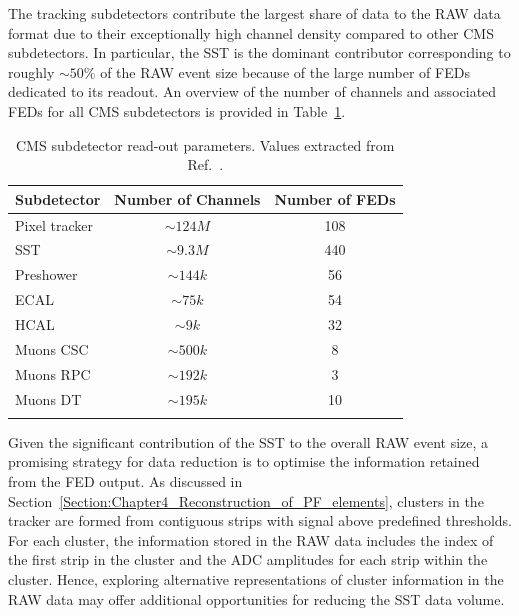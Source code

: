 The tracking subdetectors contribute the largest share of data to the RAW data format due to their exceptionally high channel density compared to other \ac{CMS} subdetectors. In particular, the \ac{SST} is the dominant contributor corresponding to roughly $\sim 50\%$ of the RAW event size because of the large number of \acp{FED} dedicated to its readout. An overview of the number of channels and associated \acp{FED} for all \ac{CMS} subdetectors is provided in Table~\ref{Table:Chapter4_RAW_Channels_FED}.

\begin{table}[htbp]
\centering
\renewcommand{\arraystretch}{1.5} %
\begin{tabular}{|l|c|c|}
\hline
Subdetector & Number of Channels & Number of \acp{FED} \\
\hline \hline
Pixel tracker & $\sim124\unit{M}$ & 108 \\
\arrayrulecolor{lightgray} \hline
\ac{SST} & $\sim9.3\unit{M}$ & 440 \\
\arrayrulecolor{lightgray} \hline
Preshower & $\sim144\unit{k}$ & 56 \\
\arrayrulecolor{lightgray} \hline
\ac{ECAL} & $\sim75\unit{k}$ & 54 \\
\arrayrulecolor{lightgray} \hline
\ac{HCAL} & $\sim9\unit{k}$ & 32 \\
\arrayrulecolor{lightgray} \hline
Muons \ac{CSC} & $\sim500\unit{k}$ & 8 \\
\arrayrulecolor{lightgray} \hline
Muons \ac{RPC} & $\sim192\unit{k}$ & 3 \\
\arrayrulecolor{lightgray} \hline
Muons \ac{DT} & $\sim195\unit{k}$ & 10 \\
\arrayrulecolor{lightgray} \hline
\arrayrulecolor{black} \hline
\end{tabular}
\caption[CMS subdetector read-out parameters]{\ac{CMS} subdetector read-out parameters. Values extracted from Ref.~\cite{LHC_CMS,CMS_Tracker_Phase1_Upgrade_2}.}
\label{Table:Chapter4_RAW_Channels_FED}
\end{table}

Given the significant contribution of the \ac{SST} to the overall RAW event size, a promising strategy for data reduction is to optimise the information retained from the \ac{FED} output. As discussed in Section~\ref{Section:Chapter4_Reconstruction_of_PF_elements}, clusters in the tracker are formed from contiguous strips with signal above predefined thresholds. For each cluster, the information stored in the RAW data includes the index of the first strip in the cluster and the ADC amplitudes for each strip within the cluster. Hence, exploring alternative representations of cluster information in the RAW data may offer additional opportunities for reducing the \ac{SST} data volume.

